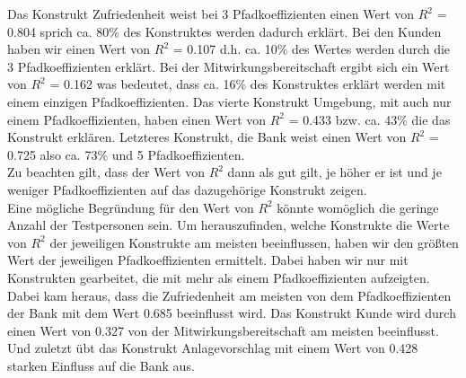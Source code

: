\documentclass{article}\usepackage[]{graphicx}\usepackage[]{color}
\begin{document}
Das Konstrukt Zufriedenheit  weist bei 3 Pfadkoeffizienten einen Wert von $R^{2}$ = 0.804 sprich ca. 80\% des Konstruktes werden dadurch erklärt. Bei den Kunden haben wir einen Wert von $R^{2}$ = 0.107 d.h. ca. 10\% des Wertes werden durch die 3 Pfadkoeffizienten erklärt. Bei der Mitwirkungsbereitschaft ergibt sich ein Wert von $R^{2}$ = 0.162 was bedeutet, dass ca. 16\% des Konstruktes erklärt werden mit einem einzigen Pfadkoeffizienten. Das vierte Konstrukt Umgebung, mit auch nur einem Pfadkoeffizienten, haben einen Wert von $R^{2}$ = 0.433 bzw. ca. 43\% die das Konstrukt erklären. Letzteres Konstrukt, die Bank weist einen Wert von $R^{2}$ = 0.725 also ca. 73\% und 5 Pfadkoeffizienten.\\
Zu beachten gilt, dass der Wert von $R^{2}$ dann als gut gilt, je höher er ist und je weniger Pfadkoeffizienten auf das dazugehörige Konstrukt zeigen. \\
Eine mögliche Begründung für den Wert von $R^{2}$ könnte womöglich die geringe Anzahl der Testpersonen sein.
Um herauszufinden, welche Konstrukte die Werte von $R^{2}$ der jeweiligen Konstrukte am meisten beeinflussen, haben wir den größten Wert der jeweiligen Pfadkoeffizienten ermittelt. Dabei haben wir nur mit Konstrukten gearbeitet, die mit mehr als einem Pfadkoeffizienten aufzeigten.\\
Dabei kam heraus, dass die Zufriedenheit am meisten von dem Pfadkoeffizienten der Bank mit dem Wert 0.685 beeinflusst wird. Das Konstrukt Kunde wird durch einen Wert von 0.327 von der Mitwirkungsbereitschaft am meisten beeinflusst. Und zuletzt übt das Konstrukt Anlagevorschlag mit einem Wert von 0.428 starken Einfluss auf die Bank aus.
\end{document}
